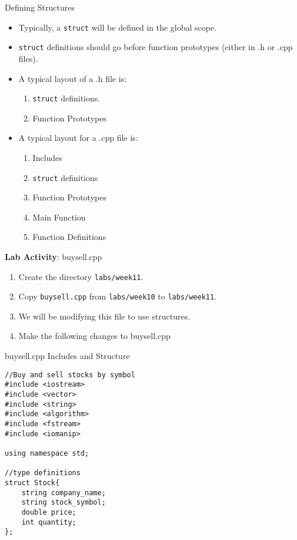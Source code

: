 \documentclass[]{beamer}
\begin{document}
\begin{frame}[fragile]{Defining Structures}
    \begin{itemize}[<+->]
        \item Typically, a \texttt{struct} will be defined in the
            global scope.
        \item \texttt{struct} definitions should go before function
            prototypes (either in .h or .cpp files).
        \item A typical layout of a .h file is:
        \begin{enumerate}
            \item \texttt{struct} definitions.
            \item Function Prototypes
        \end{enumerate}
        \item A typical layout for a .cpp file is:
        \begin{enumerate}
            \item Includes
            \item \texttt{struct} definitions
            \item Function Prototypes
            \item Main Function
            \item Function Definitions
        \end{enumerate}
    \end{itemize}
\end{frame}

\begin{frame}{\textbf{Lab Activity}: buysell.cpp}
    \begin{enumerate}[<+->]
        \item Create the directory \texttt{labs/week11}.
        \item Copy \texttt{buysell.cpp} from \texttt{labs/week10} to
            \texttt{labs/week11}.
        \item We will be modifying this file to use structures.
        \item Make the following changes to buysell.cpp
    \end{enumerate}
\end{frame}


\begin{frame}[fragile]{buysell.cpp Includes and Structure}
\begin{adjustbox}{max totalheight=0.90\textheight}
\begin{BVerbatim}
//Buy and sell stocks by symbol
#include <iostream>
#include <vector>
#include <string>
#include <algorithm>
#include <fstream>
#include <iomanip>

using namespace std;

//type definitions
struct Stock{
    string company_name;
    string stock_symbol;
    double price;
    int quantity;
};
\end{BVerbatim}
\end{adjustbox}
\end{frame}
\end{document}

